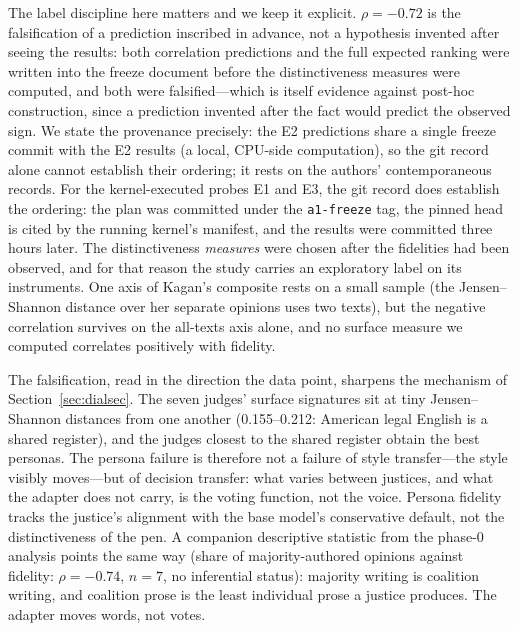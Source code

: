 The label discipline here matters and we keep it explicit. $\rho
=-0.72$ is the falsification of a prediction inscribed in advance,
not a hypothesis invented after seeing the results: both correlation
predictions and the full expected ranking were written into the
freeze document before the distinctiveness measures were computed,
and both were falsified---which is itself evidence against post-hoc
construction, since a prediction invented after the fact would
predict the observed sign. We state the provenance precisely:
the E2 predictions share a single freeze commit with the E2 results
(a local, CPU-side computation), so the git record alone cannot
establish their ordering; it rests on the authors' contemporaneous
records. For the kernel-executed probes E1 and E3, the git record
does establish the ordering: the plan was committed under the
\texttt{a1-freeze} tag, the pinned head is cited by the running
kernel's manifest, and the results were committed three hours later.
The distinctiveness \emph{measures}
were chosen after the fidelities had been observed, and for that
reason the study carries an exploratory label on its instruments.
One axis of Kagan's composite rests on a small sample (the
Jensen--Shannon distance over her separate opinions uses two texts),
but the negative correlation survives on the all-texts axis alone,
and no surface measure we computed correlates positively with
fidelity.

The falsification, read in the direction the data point, sharpens the
mechanism of Section~\ref{sec:dialsec}. The seven judges' surface
signatures sit at tiny Jensen--Shannon distances from one another
(0.155--0.212: American legal English is a shared register), and the
judges closest to the shared register obtain the best personas. The
persona failure is therefore not a failure of style transfer---the
style visibly moves---but of decision transfer: what varies between
justices, and what the adapter does not carry, is the voting function,
not the voice. Persona fidelity tracks the justice's alignment with
the base model's conservative default, not the distinctiveness of the
pen. A companion descriptive statistic from the phase-0 analysis
points the same way (share of majority-authored opinions against
fidelity: $\rho=-0.74$, $n=7$, no inferential status): majority
writing is coalition writing, and coalition prose is the least
individual prose a justice produces. The adapter moves words, not
votes.
